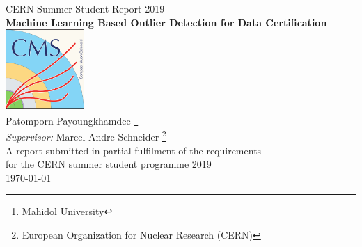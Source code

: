 \documentclass[11pt,oneside]{book}
\begin{document}

\frontmatter

\begin{titlepage}




\begin{center}
{\LARGE CERN Summer Student Report 2019}\\[1.5cm]
\linespread{1.2}\huge {\bfseries Machine Learning Based Outlier Detection for Data Certification}\\[1.5cm]
\linespread{1}
\includegraphics[width=3cm]{images/CMS_logo_May2014-eps-converted-to.pdf}\\[1cm]
{\Large Patomporn Payoungkhamdee \footnote{Mahidol University}}\\[1cm]
{\large \emph{Supervisor:} Marcel Andre Schneider \footnote{European Organization for Nuclear Research (CERN)}}\\[1cm] %
\large A report submitted in partial fulfilment of the requirements\\ for the CERN summer student programme 2019 \\[2cm] 
\today
\end{center}

\end{titlepage}



\end{document}
